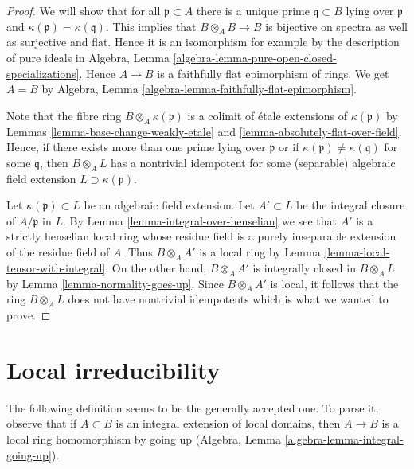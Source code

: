 \begin{proof}
We will show that for all $\mathfrak p \subset A$ there is a unique
prime $\mathfrak q \subset B$ lying over $\mathfrak p$ and
$\kappa(\mathfrak p) = \kappa(\mathfrak q)$.
This implies that $B \otimes_A B \to B$ is bijective on spectra
as well as surjective and flat. Hence it is an isomorphism
for example by the description of pure ideals in
Algebra, Lemma \ref{algebra-lemma-pure-open-closed-specializations}.
Hence $A \to B$ is a faithfully flat epimorphism of rings. We get
$A = B$ by
Algebra, Lemma \ref{algebra-lemma-faithfully-flat-epimorphism}.

\medskip\noindent
Note that the fibre ring $B \otimes_A \kappa(\mathfrak p)$
is a colimit of \'etale extensions of $\kappa(\mathfrak p)$ by
Lemmas \ref{lemma-base-change-weakly-etale} and
\ref{lemma-absolutely-flat-over-field}.
Hence, if there exists more than one prime lying over $\mathfrak p$
or if $\kappa(\mathfrak p) \not = \kappa(\mathfrak q)$ for some $\mathfrak q$,
then $B \otimes_A L$ has a nontrivial idempotent for some (separable)
algebraic field extension $L \supset \kappa(\mathfrak p)$.

\medskip\noindent
Let $\kappa(\mathfrak p) \subset L$ be an algebraic field extension.
Let $A' \subset L$ be the integral closure of $A/\mathfrak p$ in $L$.
By Lemma \ref{lemma-integral-over-henselian}
we see that $A'$ is a strictly henselian local ring
whose residue field is a purely inseparable extension of the residue
field of $A$. Thus $B \otimes_A A'$ is a local ring by
Lemma \ref{lemma-local-tensor-with-integral}.
On the other hand, $B \otimes_A A'$ is integrally closed in
$B \otimes_A L$ by Lemma \ref{lemma-normality-goes-up}.
Since $B \otimes_A A'$ is local, it follows that the ring
$B \otimes_A L$ does not have nontrivial
idempotents which is what we wanted to prove.
\end{proof}






\section{Local irreducibility}
\label{section-unibranch}

\noindent
The following definition seems to be the generally accepted one.
To parse it, observe that if $A \subset B$ is an integral extension of local
domains, then $A \to B$ is a local ring homomorphism by
going up (Algebra, Lemma \ref{algebra-lemma-integral-going-up}).

